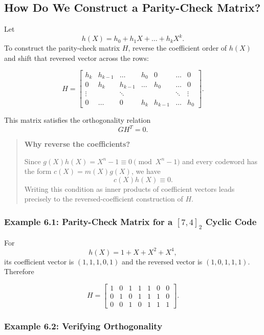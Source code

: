 \documentclass[
]{article}
\begin{document}
\subsection{How Do We Construct a Parity-Check
Matrix?}\label{how-do-we-construct-a-parity-check-matrix}

Let \[h(X)=h_0+h_1X+\dots+h_kX^k.\] To construct the parity-check matrix
\(H\), reverse the coefficient order of \(h(X)\) and shift that reversed
vector across the rows:

\[H = \begin{bmatrix}
h_k & h_{k-1} & \dots & h_0 & 0 & \dots & 0 \\
0 & h_k & h_{k-1} & \dots & h_0 & \dots & 0 \\
\vdots & & \ddots & & & \ddots & \vdots \\
0 & \dots & 0 & h_k & h_{k-1} & \dots & h_0
\end{bmatrix}.\]

This matrix satisfies the orthogonality relation \[GH^T=0.\]

\begin{quote}
\textbf{Why reverse the coefficients?}

Since \(g(X)h(X)=X^n-1 \equiv 0 \pmod{X^n-1}\) and every codeword has
the form \(c(X)=m(X)g(X)\), we have \[c(X)h(X) \equiv 0.\] Writing this
condition as inner products of coefficient vectors leads precisely to
the reversed-coefficient construction of \(H\).
\end{quote}

\subsubsection{\texorpdfstring{Example 6.1: Parity-Check Matrix for a
\([7,4]_2\) Cyclic
Code}{Example 6.1: Parity-Check Matrix for a {[}7,4{]}\_2 Cyclic Code}}\label{example-6.1-parity-check-matrix-for-a-74_2-cyclic-code}

For \[h(X)=1+X+X^2+X^4,\] its coefficient vector is \((1,1,1,0,1)\) and
the reversed vector is \((1,0,1,1,1)\). Therefore

\[H = \begin{bmatrix}
1 & 0 & 1 & 1 & 1 & 0 & 0 \\
0 & 1 & 0 & 1 & 1 & 1 & 0 \\
0 & 0 & 1 & 0 & 1 & 1 & 1
\end{bmatrix}.\]

\subsubsection{Example 6.2: Verifying
Orthogonality}\label{example-6.2-verifying-orthogonality}
\end{document}
